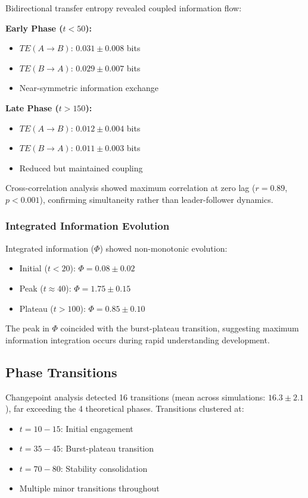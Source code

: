 \documentclass[12pt]{article}
\begin{document}
Bidirectional transfer entropy revealed coupled information flow:

\textbf{Early Phase ($t < 50$):}
\begin{itemize}
\item $TE(A \rightarrow B)$: $0.031 \pm 0.008$ bits
\item $TE(B \rightarrow A)$: $0.029 \pm 0.007$ bits
\item Near-symmetric information exchange
\end{itemize}

\textbf{Late Phase ($t > 150$):}
\begin{itemize}
\item $TE(A \rightarrow B)$: $0.012 \pm 0.004$ bits
\item $TE(B \rightarrow A)$: $0.011 \pm 0.003$ bits
\item Reduced but maintained coupling
\end{itemize}

Cross-correlation analysis showed maximum correlation at zero lag ($r = 0.89$, $p < 0.001$), confirming simultaneity rather than leader-follower dynamics.

\subsubsection{Integrated Information Evolution}

Integrated information ($\Phi$) showed non-monotonic evolution:
\begin{itemize}
\item Initial ($t < 20$): $\Phi = 0.08 \pm 0.02$
\item Peak ($t \approx 40$): $\Phi = 1.75 \pm 0.15$
\item Plateau ($t > 100$): $\Phi = 0.85 \pm 0.10$
\end{itemize}

The peak in $\Phi$ coincided with the burst-plateau transition, suggesting maximum information integration occurs during rapid understanding development.

\subsection{Phase Transitions}

Changepoint analysis detected 16 transitions (mean across simulations: $16.3 \pm 2.1$), far exceeding the 4 theoretical phases. Transitions clustered at:
\begin{itemize}
\item $t = 10-15$: Initial engagement
\item $t = 35-45$: Burst-plateau transition
\item $t = 70-80$: Stability consolidation
\item Multiple minor transitions throughout
\end{itemize}
\end{document}
